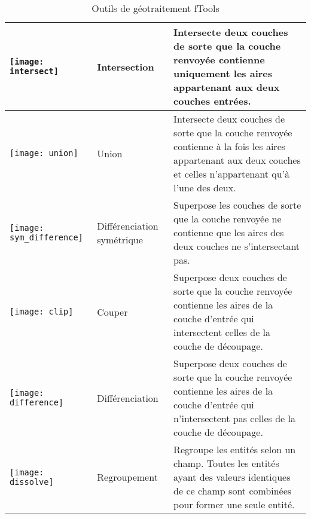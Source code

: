 \begin{table}[ht]
\begin{tabular}{|m{1cm}|m{3cm}|m{12cm}|}
 \hline \texttt{[image: intersect]} & Intersection & Intersecte deux couches de sorte que la couche renvoyée contienne uniquement les aires appartenant aux deux couches entrées. \\
 \hline \texttt{[image: union]} & Union & Intersecte deux couches de sorte que la couche renvoyée contienne à la fois les aires appartenant aux deux couches et celles n'appartenant qu'à l'une des deux. \\
 \hline \texttt{[image: sym\_difference]} & Différenciation symétrique & Superpose les couches de sorte que la couche renvoyée ne contienne que les aires des deux couches ne s'intersectant pas. \\
 \hline \texttt{[image: clip]} & Couper & Superpose deux couches de sorte que la couche renvoyée contienne les aires de la couche d'entrée qui intersectent celles de la couche de découpage. \\
 \hline \texttt{[image: difference]} & Différenciation & Superpose deux couches de sorte que la couche renvoyée contienne les aires de la couche d'entrée qui n'intersectent pas celles de la couche de découpage. \\
 \hline \texttt{[image: dissolve]} & Regroupement & Regroupe les entités selon un champ. Toutes les entités ayant des valeurs identiques de ce champ sont combinées pour former une seule entité. \\
 \hline
\end{tabular}
\caption{Outils de géotraitement fTools}\label{tab:ftool_geoprocessing}
\end{table}

